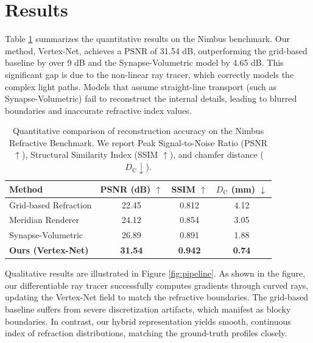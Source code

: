 \section{Results}
Table \ref{tab:results} summarizes the quantitative results on the Nimbus benchmark. Our method, Vertex-Net, achieves a PSNR of 31.54 dB, outperforming the grid-based baseline by over 9 dB and the Synapse-Volumetric model by 4.65 dB. This significant gap is due to the non-linear ray tracer, which correctly models the complex light paths. Models that assume straight-line transport (such as Synapse-Volumetric) fail to reconstruct the internal details, leading to blurred boundaries and inaccurate refractive index values.

\begin{table}[t]
  \centering
  \caption{Quantitative comparison of reconstruction accuracy on the Nimbus Refractive Benchmark. We report Peak Signal-to-Noise Ratio (PSNR $\uparrow$), Structural Similarity Index (SSIM $\uparrow$), and chamfer distance ($D_{\text{C}} \downarrow$).}
  \label{tab:results}
  \begin{tabular}{l c c c}
    \toprule
    Method & PSNR (dB) $\uparrow$ & SSIM $\uparrow$ & $D_{\text{C}}$ (mm) $\downarrow$ \\
    \midrule
    Grid-based Refraction & 22.45 & 0.812 & 4.12 \\
    Meridian Renderer & 24.12 & 0.854 & 3.05 \\
    Synapse-Volumetric & 26.89 & 0.891 & 1.88 \\
    \textbf{Ours (Vertex-Net)} & \textbf{31.54} & \textbf{0.942} & \textbf{0.74} \\
    \bottomrule
  \end{tabular}
\end{table}

Qualitative results are illustrated in Figure \ref{fig:pipeline}. As shown in the figure, our differentiable ray tracer successfully computes gradients through curved rays, updating the Vertex-Net field to match the refractive boundaries. The grid-based baseline suffers from severe discretization artifacts, which manifest as blocky boundaries. In contrast, our hybrid representation yields smooth, continuous index of refraction distributions, matching the ground-truth profiles closely.
